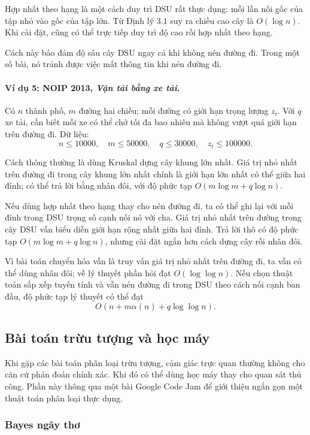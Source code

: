 \documentclass[11pt]{article}
\begin{document}
Hợp nhất theo hạng là một cách duy trì DSU rất thực dụng: mỗi lần nối gốc của
tập nhỏ vào gốc của tập lớn. Từ Định lý 3.1 suy ra chiều cao cây là
\(O(\log n)\). Khi cài đặt, cũng có thể trực tiếp duy trì độ cao rồi hợp nhất
theo hạng.

Cách này bảo đảm độ sâu cây DSU ngay cả khi không nén đường đi. Trong một số
bài, nó tránh được việc mất thông tin khi nén đường đi.

\paragraph{Ví dụ 5: NOIP 2013, \emph{Vận tải bằng xe tải}.}
Có \(n\) thành phố, \(m\) đường hai chiều; mỗi đường có giới hạn trọng lượng
\(z_i\). Với \(q\) xe tải, cần biết mỗi xe có thể chở tối đa bao nhiêu mà không
vượt quá giới hạn trên đường đi. Dữ liệu:
\[
  n\le 10000,\quad m\le 50000,\quad q\le 30000,\quad z_i\le 100000.
\]

Cách thông thường là dùng Kruskal dựng cây khung lớn nhất. Giá trị nhỏ nhất trên
đường đi trong cây khung lớn nhất chính là giới hạn lớn nhất có thể giữa hai
đỉnh; có thể trả lời bằng nhân đôi, với độ phức tạp
\(O(m\log m+q\log n)\).

Nếu dùng hợp nhất theo hạng thay cho nén đường đi, ta có thể ghi lại với mỗi
đỉnh trong DSU trọng số cạnh nối nó với cha. Giá trị nhỏ nhất trên đường trong
cây DSU vẫn biểu diễn giới hạn rộng nhất giữa hai đỉnh. Trả lời thô có độ phức
tạp \(O(m\log m+q\log n)\), nhưng cài đặt ngắn hơn cách dựng cây rồi nhân đôi.

Vì bài toán chuyển hóa vẫn là truy vấn giá trị nhỏ nhất trên đường đi, ta vẫn có
thể dùng nhân đôi; về lý thuyết phần hỏi đạt \(O(\log\log n)\). Nếu chọn thuật
toán sắp xếp tuyến tính và vẫn nén đường đi trong DSU theo cách nối cạnh ban
đầu, độ phức tạp lý thuyết có thể đạt
\[
  O(n+m\alpha(n)+q\log\log n).
\]

\subsection{Bài toán trừu tượng và học máy}

Khi gặp các bài toán phân loại trừu tượng, cảm giác trực quan thường không cho
căn cứ phán đoán chính xác. Khi đó có thể dùng học máy thay cho quan sát thủ
công. Phần này thông qua một bài Google Code Jam để giới thiệu ngắn gọn một
thuật toán phân loại thực dụng.

\subsubsection{Bayes ngây thơ}
\end{document}
